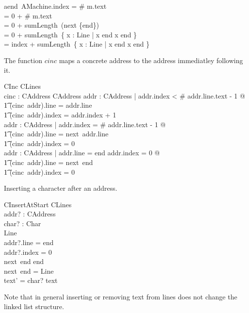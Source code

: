 \documentclass{article}
\begin{document}
\begin{argue}
aend~\theta AMachine.index
= \# m.text \\
= 0 + \# m.text \\
= 0 + sumLength~(\dom next \setminus \{end\}) \\
= 0 + sumLength~\{ x : Line | x  end \land x \neq end \} \\
= index + sumLength~\{ x : Line | x  end \land x \neq end \} 
\end{argue}

The function $cinc$ maps a concrete address to the address immediatley 
following it.

\begin{schema}{CInc}
  CLines \\
  cinc : CAddress \fun CAddress
\where
  \forall addr : CAddress | addr.index < \# addr.line.text - 1 @ \\
\t1 (cinc~addr).line = addr.line \land {} \\
\t1 (cinc~addr).index = addr.index + 1 \\
  \forall addr : CAddress | addr.index = \# addr.line.text - 1 @ \\
\t1  (cinc~addr).line = next~addr.line \land {} \\
\t1  (cinc~addr).index = 0 \\
  \forall addr : CAddress | addr.line = end \land addr.index = 0 @ \\
\t1  (cinc~addr).line = next~end \land {} \\
\t1  (cinc~addr).index = 0
\end{schema}

Inserting a character after an address.

\begin{schema}{CInsertAtStart}
  CLines \\
  addr? : CAddress \\
  char? : Char \\
  \Delta Line \\
\where
  addr?.line = end \\
  addr?.index = 0 \\
  next~end \neq end \\
  next~end = \theta Line \\
  text' = \langle char? \rangle \cat text 
\end{schema}

Note that in general inserting or removing text from lines does not
change the linked list structure.
\end{document}
